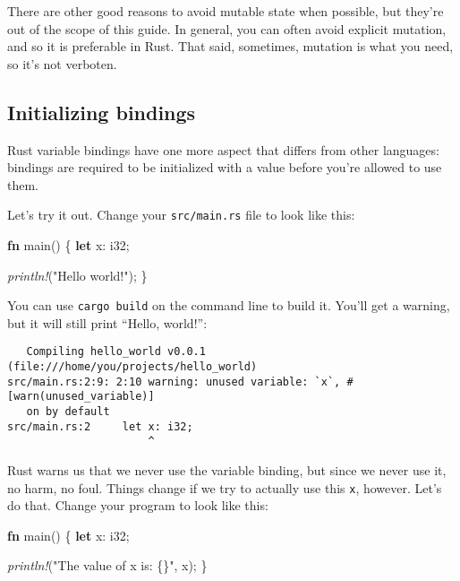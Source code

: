\documentclass[a4paper,]{book}
\newenvironment{Shaded}{\begin{snugshade}}{\end{snugshade}}
\newcommand{\KeywordTok}[1]{\textcolor[rgb]{0.13,0.29,0.53}{\textbf{{#1}}}}
\newcommand{\DataTypeTok}[1]{\textcolor[rgb]{0.13,0.29,0.53}{{#1}}}
\newcommand{\StringTok}[1]{\textcolor[rgb]{0.31,0.60,0.02}{{#1}}}
\newcommand{\PreprocessorTok}[1]{\textcolor[rgb]{0.56,0.35,0.01}{\textit{{#1}}}}
\newcommand{\NormalTok}[1]{{#1}}
\begin{document}
There are other good reasons to avoid mutable state when possible, but
they're out of the scope of this guide. In general, you can often avoid
explicit mutation, and so it is preferable in Rust. That said,
sometimes, mutation is what you need, so it's not verboten.

\subsection{Initializing bindings}\label{initializing-bindings}

Rust variable bindings have one more aspect that differs from other
languages: bindings are required to be initialized with a value before
you're allowed to use them.

Let's try it out. Change your \texttt{src/main.rs} file to look like
this:

\begin{Shaded}
\begin{Highlighting}[]
\KeywordTok{fn} \NormalTok{main() \{}
    \KeywordTok{let} \NormalTok{x: }\DataTypeTok{i32}\NormalTok{;}

    \PreprocessorTok{println!}\NormalTok{(}\StringTok{"Hello world!"}\NormalTok{);}
\NormalTok{\}}
\end{Highlighting}
\end{Shaded}

You can use \texttt{cargo\ build} on the command line to build it.
You'll get a warning, but it will still print ``Hello, world!'':

\begin{verbatim}
   Compiling hello_world v0.0.1 (file:///home/you/projects/hello_world)
src/main.rs:2:9: 2:10 warning: unused variable: `x`, #[warn(unused_variable)]
   on by default
src/main.rs:2     let x: i32;
                      ^
\end{verbatim}

Rust warns us that we never use the variable binding, but since we never
use it, no harm, no foul. Things change if we try to actually use this
\texttt{x}, however. Let's do that. Change your program to look like
this:

\begin{Shaded}
\begin{Highlighting}[]
\KeywordTok{fn} \NormalTok{main() \{}
    \KeywordTok{let} \NormalTok{x: }\DataTypeTok{i32}\NormalTok{;}

    \PreprocessorTok{println!}\NormalTok{(}\StringTok{"The value of x is: \{\}"}\NormalTok{, x);}
\NormalTok{\}}
\end{Highlighting}
\end{Shaded}
\end{document}
